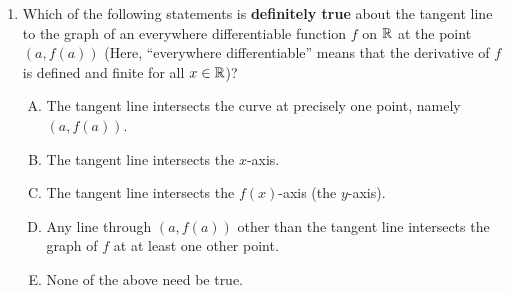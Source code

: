\documentclass[10pt]{amsart}
\begin{document}
\begin{enumerate}
  \begin{enumerate}[(A)]
  \item The derivative of the sum of two functions is the sum of the
    derivatives of the functions.
  \item The derivative of the difference of two functions is the
    difference of the derivatives of the functions.
  \item The derivative of a constant times a function is the same
    constant times the derivative of the function.
  \item The derivative of the product of two functions is the product
    of the derivatives of the functions.
  \item None of the above, i.e., they are all valid as general rules.
  \end{enumerate}

  {\em Answer}: Option (D)

  {\em Explanation}: The correct replacement of option (D) is the
  product rule for derivatives, which, in words, states that: ``the
  derivative of the product of two functions is the sum of the product
  of the derivative of the first function with the second function and
  the product of the first function with the derivative of the second
  function.'' If that seems cumbersome to you, feel grateful for the
  power of algebraic symbols to capture this compactly:

  $$(f \cdot g)' = (f' \cdot g) + (f \cdot g')$$

  {\em Performance review}: $6$ out of $12$ people got this
  correct. $4$ chose (E) and $2$ chose (C).

  {\em Historical note (last year)}: $10$ ouf to $12$ people got this
  correct. $1$ person chose (C) and $1$ person chose (E).

  {\em Note on better performance last year}: I think I got time to
  review the product rule for differentiation {\em before} the quiz
  last year, which was probably helpful.

\item Which of the following statements is {\bf definitely true} about
  the tangent line to the graph of an everywhere differentiable
  function $f$ on $\mathbb{R}$ at the point $(a,f(a))$ (Here, ``everywhere
  differentiable'' means that the derivative of $f$ is defined and
  finite for all $x \in \mathbb{R}$)?

  \begin{enumerate}[(A)]

  \item The tangent line intersects the curve at precisely one point,
    namely $(a,f(a))$.
  \item The tangent line intersects the $x$-axis.
  \item The tangent line intersects the $f(x)$-axis (the $y$-axis).
  \item Any line through $(a,f(a))$ other than the tangent line
    intersects the graph of $f$ at at least one other point.
  \item None of the above need be true.
  \end{enumerate}


\end{enumerate}
\end{document}
